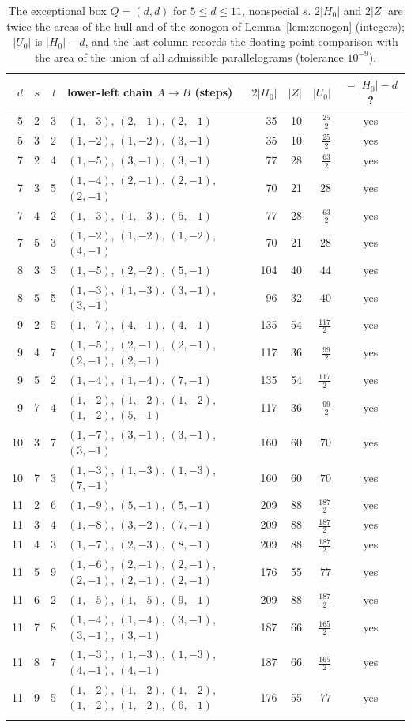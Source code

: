 \begin{longtable}{@{}rrr p{4.6cm} rrrc@{}}
\toprule $d$ & $s$ & $t$ & lower-left chain $A\to B$ (steps) & $2|H_0|$ & $|Z|$ & $|U_0|$ & $=|H_0|-d$?\\\midrule\endhead
5 & 2 & 3 & $(1,-3)$, $(2,-1)$, $(2,-1)$ & 35 & 10 & $\tfrac{25}{2}$ & yes\\
5 & 3 & 2 & $(1,-2)$, $(1,-2)$, $(3,-1)$ & 35 & 10 & $\tfrac{25}{2}$ & yes\\
7 & 2 & 4 & $(1,-5)$, $(3,-1)$, $(3,-1)$ & 77 & 28 & $\tfrac{63}{2}$ & yes\\
7 & 3 & 5 & $(1,-4)$, $(2,-1)$, $(2,-1)$, $(2,-1)$ & 70 & 21 & $28$ & yes\\
7 & 4 & 2 & $(1,-3)$, $(1,-3)$, $(5,-1)$ & 77 & 28 & $\tfrac{63}{2}$ & yes\\
7 & 5 & 3 & $(1,-2)$, $(1,-2)$, $(1,-2)$, $(4,-1)$ & 70 & 21 & $28$ & yes\\
8 & 3 & 3 & $(1,-5)$, $(2,-2)$, $(5,-1)$ & 104 & 40 & $44$ & yes\\
8 & 5 & 5 & $(1,-3)$, $(1,-3)$, $(3,-1)$, $(3,-1)$ & 96 & 32 & $40$ & yes\\
9 & 2 & 5 & $(1,-7)$, $(4,-1)$, $(4,-1)$ & 135 & 54 & $\tfrac{117}{2}$ & yes\\
9 & 4 & 7 & $(1,-5)$, $(2,-1)$, $(2,-1)$, $(2,-1)$, $(2,-1)$ & 117 & 36 & $\tfrac{99}{2}$ & yes\\
9 & 5 & 2 & $(1,-4)$, $(1,-4)$, $(7,-1)$ & 135 & 54 & $\tfrac{117}{2}$ & yes\\
9 & 7 & 4 & $(1,-2)$, $(1,-2)$, $(1,-2)$, $(1,-2)$, $(5,-1)$ & 117 & 36 & $\tfrac{99}{2}$ & yes\\
10 & 3 & 7 & $(1,-7)$, $(3,-1)$, $(3,-1)$, $(3,-1)$ & 160 & 60 & $70$ & yes\\
10 & 7 & 3 & $(1,-3)$, $(1,-3)$, $(1,-3)$, $(7,-1)$ & 160 & 60 & $70$ & yes\\
11 & 2 & 6 & $(1,-9)$, $(5,-1)$, $(5,-1)$ & 209 & 88 & $\tfrac{187}{2}$ & yes\\
11 & 3 & 4 & $(1,-8)$, $(3,-2)$, $(7,-1)$ & 209 & 88 & $\tfrac{187}{2}$ & yes\\
11 & 4 & 3 & $(1,-7)$, $(2,-3)$, $(8,-1)$ & 209 & 88 & $\tfrac{187}{2}$ & yes\\
11 & 5 & 9 & $(1,-6)$, $(2,-1)$, $(2,-1)$, $(2,-1)$, $(2,-1)$, $(2,-1)$ & 176 & 55 & $77$ & yes\\
11 & 6 & 2 & $(1,-5)$, $(1,-5)$, $(9,-1)$ & 209 & 88 & $\tfrac{187}{2}$ & yes\\
11 & 7 & 8 & $(1,-4)$, $(1,-4)$, $(3,-1)$, $(3,-1)$, $(3,-1)$ & 187 & 66 & $\tfrac{165}{2}$ & yes\\
11 & 8 & 7 & $(1,-3)$, $(1,-3)$, $(1,-3)$, $(4,-1)$, $(4,-1)$ & 187 & 66 & $\tfrac{165}{2}$ & yes\\
11 & 9 & 5 & $(1,-2)$, $(1,-2)$, $(1,-2)$, $(1,-2)$, $(1,-2)$, $(6,-1)$ & 176 & 55 & $77$ & yes\\
\bottomrule\caption{The exceptional box $Q=(d,d)$ for $5\le d\le11$, nonspecial $s$. $2|H_0|$ and $2|Z|$ are twice the areas of the hull and of the zonogon of Lemma~\ref{lem:zonogon} (integers); $|U_0|$ is $|H_0|-d$, and the last column records the floating-point comparison with the area of the union of all admissible parallelograms (tolerance $10^{-9}$).}\label{tab:exc}\end{longtable}